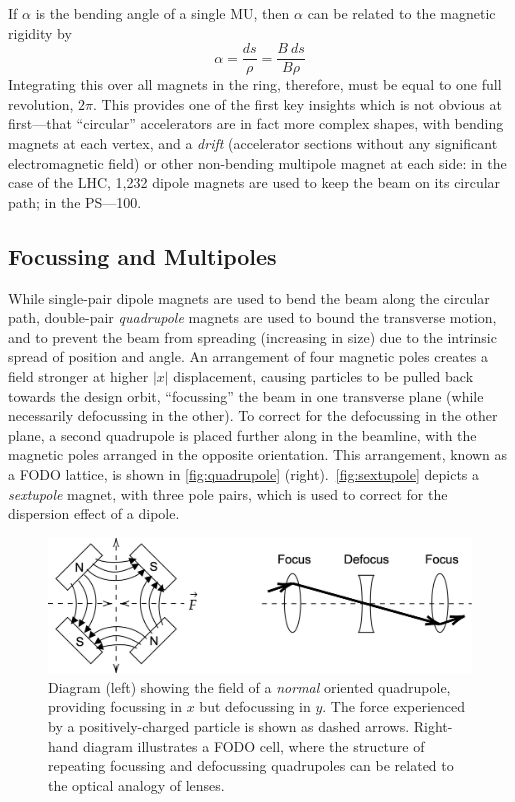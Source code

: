 \documentclass[a4paper,twoside,11pt]{report}
\begin{document}
If $\alpha$ is the bending angle of a single MU, then $\alpha$ can be related to the magnetic rigidity by
\begin{equation}
\alpha=\frac{ds}\rho=\frac{B\ ds}{B\rho}
\end{equation}
Integrating this over all magnets in the ring, therefore, must be equal to one full revolution, $2\pi$. This provides one of the first key insights which is not obvious at first---that ``circular'' accelerators are in fact more complex shapes, with bending magnets at each vertex, and a \textit{drift} (accelerator sections without any significant electromagnetic field) or other non-bending multipole magnet at each side: in the case of the LHC, 1,232 dipole magnets are used to keep the beam on its circular path; in the PS---100.

\subsection{Focussing and Multipoles}

While single-pair dipole magnets are used to bend the beam along the circular path, double-pair \textit{quadrupole} magnets are used to bound the transverse motion, and to prevent the beam from spreading (increasing in size) due to the intrinsic spread of position and angle. An arrangement of four magnetic poles creates a field stronger at higher $|x|$ displacement, causing particles to be pulled back towards the design orbit, ``focussing'' the beam in one transverse plane (while necessarily defocussing in the other). To correct for the defocussing in the other plane, a second quadrupole is placed further along in the beamline, with the magnetic poles arranged in the opposite orientation. This arrangement, known as a FODO lattice, is shown in \autoref{fig:quadrupole} (right).~\autoref{fig:sextupole} depicts a \textit{sextupole} magnet, with three pole pairs, which is used to correct for the dispersion effect of a dipole.

\begin{figure}
\centering
  \includegraphics*[width=0.9\linewidth]{fodo.png}
  \caption[Diagrams of a quadrupole magnetic field, and a FODO cell]{Diagram (left) showing the field of a \textit{normal} oriented quadrupole, providing focussing in $x$ but defocussing in $y$. The force experienced by a positively-charged particle is shown as dashed arrows. Right-hand diagram illustrates a FODO cell, where the structure of repeating focussing and defocussing quadrupoles can be related to the optical analogy of lenses.}\label{fig:quadrupole}
\end{figure}
\end{document}
